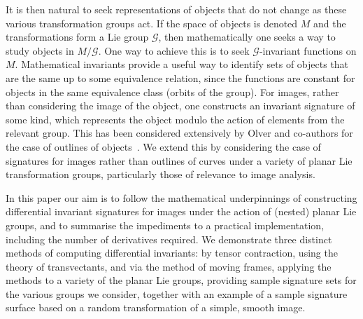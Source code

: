 \documentclass[review,onefignum,onetabnum]{siamonline190516}
\begin{document}
It is then natural to seek representations of objects that do not change as these various transformation groups act. If the space of objects is denoted $M$ and the transformations form a Lie group $\mathcal{G}$, then mathematically one seeks a way to study objects in $M / \mathcal{G}$.  One way to achieve this is to seek $\mathcal{G}$-invariant functions on $M$. Mathematical invariants provide a useful way to identify sets of objects that are the same up to some equivalence relation, since the functions are constant for objects in the same equivalence class (orbits of the group). For images, rather than considering the image of the object, one constructs an invariant signature of some kind, which represents the object modulo the action of elements from the relevant group. This has been considered extensively by Olver and co-authors for the case of outlines of objects~\citep{Calabi1998,Hoff2013}. We extend this by considering the case of signatures for images rather than outlines of curves under a variety of planar Lie transformation groups, particularly those of relevance to image analysis.

In this paper our aim is to follow the mathematical underpinnings of constructing differential invariant signatures for images under the action of (nested) planar Lie groups, and to summarise the impediments to a practical implementation, including the number of derivatives required. We demonstrate three distinct methods of computing differential invariants: by tensor contraction, using the theory of transvectants, and via the method of moving frames, applying the methods to a variety of the planar Lie groups, providing sample signature sets for the various groups we consider, together with an example of a sample signature surface based on a random transformation of a simple, smooth image.

\end{document}
